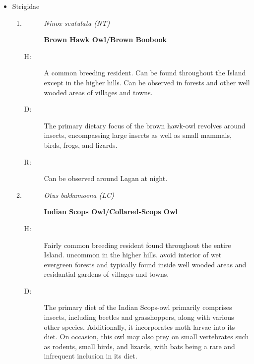 \begin{itemize}
\begin{enumerate}
%
\end{enumerate}%
\item%
Strigidae%
\begin{enumerate}%
\item%
\begin{description}%
\item[]%
\textit{Ninox scutulata (NT)}%
\item[]%
\textbf{Brown Hawk Owl/Brown Boobook}%
\end{description}%
\begin{description}%
\item[H: ]%
A common breeding resident. Can be found throughout the Island except in the higher hills. Can be observed in forests and other well wooded areas of villages and towns. %
\item[D: ]%
The primary dietary focus of the brown hawk{-}owl revolves around insects, encompassing large insects as well as small mammals, birds, frogs, and lizards.%
\item[R: ]%
Can be observed around Lagan at night.%
\end{description}%
\item%
\begin{description}%
\item[]%
\textit{Otus bakkamoena (LC)}%
\item[]%
\textbf{Indian Scops Owl/Collared{-}Scops Owl}%
\end{description}%
\begin{description}%
\item[H: ]%
Fairly common breeding resident found throughout the entire Island. uncommon in the higher hills. avoid interior of wet evergreen forests and typically found inside well wooded areas and residantial gardens of villages and towns.%
\item[D: ]%
The primary diet of the Indian Scops{-}owl primarily comprises insects, including beetles and grasshoppers, along with various other species. Additionally, it incorporates moth larvae into its diet. On occasion, this owl may also prey on small vertebrates such as rodents, small birds, and lizards, with bats being a rare and infrequent inclusion in its diet.%

\end{description}
\end{enumerate}
\end{itemize}
